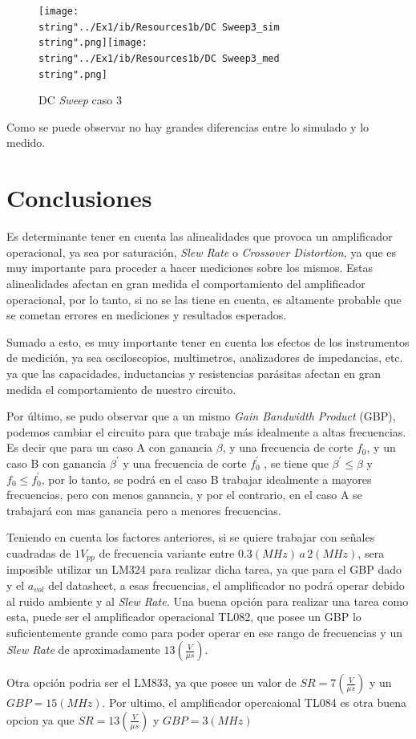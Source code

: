 \begin{figure}[H]
\begin{centering}
\texttt{[image: \\string"../Ex1/ib/Resources1b/DC Sweep3\_sim\\string".png]}\texttt{[image: \\string"../Ex1/ib/Resources1b/DC Sweep3\_med\\string".png]}
\par\end{centering}
\caption{DC \emph{Sweep} caso 3}
\end{figure}

Como se puede observar no hay grandes diferencias entre lo simulado
y lo medido.

\section{Conclusiones}

Es determinante tener en cuenta las alinealidades que provoca un amplificador
operacional, ya sea por saturación, \emph{Slew Rate }o \emph{Crossover
Distortion, }ya que es muy importante para proceder a hacer mediciones
sobre los mismos. Estas alinealidades afectan en gran medida el comportamiento
del amplificador operacional, por lo tanto, si no se las tiene en
cuenta, es altamente probable que se cometan errores en mediciones
y resultados esperados.

Sumado a esto, es muy importante tener en cuenta los efectos de los
instrumentos de medición, ya sea osciloscopios, multimetros, analizadores
de impedancias, etc. ya que las capacidades, inductancias y resistencias
parásitas afectan en gran medida el comportamiento de nuestro circuito.

Por último, se pudo observar que a un mismo \emph{Gain Bandwidth Product
}(GBP), podemos cambiar el circuito para que trabaje más idealmente
a altas frecuencias. Es decir que para un caso A con ganancia $\beta$,
y una frecuencia de corte $f_{0}$, y un caso B con ganancia $\beta^{'}$
y una frecuencia de corte $f_{0}^{'}$ , se tiene que $\beta^{'}\leq\beta$
y $f_{0}\leq f_{0}^{'}$, por lo tanto, se podrá en el caso B trabajar
idealmente a mayores frecuencias, pero con menos ganancia, y por el
contrario, en el caso A se trabajará con mas ganancia pero a menores
frecuencias.

Teniendo en cuenta los factores anteriores, si se quiere trabajar
con señales cuadradas de $1V_{pp}$ de frecuencia variante entre $0.3(MHz)\,a\,2(MHz)$,
sera imposible utilizar un LM324 para realizar dicha tarea, ya que
para el GBP dado y el $a_{vol}$ del datasheet, a esas frecuencias,
el amplificador no podrá operar debido al ruido ambiente y al \emph{Slew
Rate. }Una buena opción para realizar una tarea como esta, puede ser
el amplificador operacional TL082, que posee un GBP lo suficientemente
grande como para poder operar en ese rango de frecuencias y un \emph{Slew
Rate }de aproximadamente $13\left(\frac{V}{\mu s}\right)$.

Otra opción podria ser el LM833, ya que posee un valor de $SR=7\left(\frac{V}{\mu s}\right)$
y un $GBP=15(MHz)$. Por ultimo, el amplificador opercaional TL084
es otra buena opcion ya que $SR=13\left(\frac{V}{\mu s}\right)$ y
$GBP=3(MHz)$
